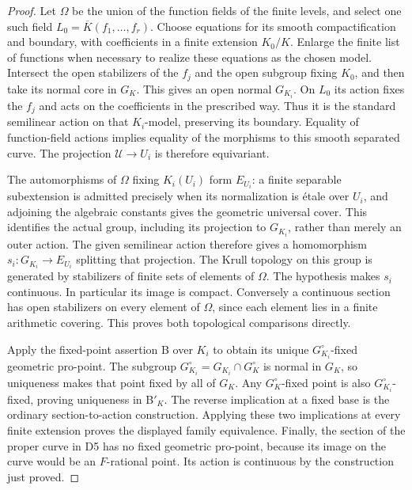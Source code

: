 \begin{proof}
Let $\Omega$ be the union of the function fields of the finite levels,
and select one such field $L_0=\overline K(f_1,\ldots,f_r)$.
Choose equations for its smooth compactification and boundary, with
coefficients in a finite extension $K_0/K$.  Enlarge the finite list of
functions when necessary to realize these equations as the chosen
model.  Intersect the open stabilizers of the $f_j$ and the open
subgroup fixing $K_0$, and then take its normal core in $G_K$.
This gives an open normal $G_{K_i}$.  On $L_0$ its action fixes the
$f_j$ and acts on the coefficients in the prescribed way.  Thus it
is the standard semilinear action on that $K_i$-model, preserving its
boundary.  Equality of function-field actions implies equality of the
morphisms to this smooth separated curve.  The projection
$\mathcal U\to U_i$ is therefore equivariant.

The automorphisms of $\Omega$ fixing $K_i(U_i)$ form $E_{U_i}$: a
finite separable subextension is admitted precisely when its
normalization is \'etale over $U_i$, and adjoining the algebraic
constants gives the geometric universal cover.  This identifies the
actual group, including its projection to $G_{K_i}$, rather than merely
an outer action.  The given semilinear action therefore gives a
homomorphism $s_i:G_{K_i}\to E_{U_i}$ splitting that projection.
The Krull topology on this group is generated by stabilizers of finite
sets of elements of $\Omega$.  The hypothesis makes $s_i$ continuous.
In particular its image is compact.  Conversely a continuous section
has open stabilizers on every element of $\Omega$, since each element
lies in a finite arithmetic covering.  This proves both topological
comparisons directly.

Apply the fixed-point assertion B over $K_i$ to obtain its unique
$G_{K_i}^\circ$-fixed geometric pro-point.  The subgroup
$G_{K_i}^\circ=G_{K_i}\cap G_K^\circ$ is normal in $G_K$, so uniqueness
makes that point fixed by all of $G_K$.  Any $G_K^\circ$-fixed point
is also $G_{K_i}^\circ$-fixed, proving uniqueness in B$'_K$.
The reverse implication at a fixed base is the ordinary
section-to-action construction.  Applying these two implications at
every finite extension proves the displayed family equivalence.
Finally, the section of the proper curve in D5 has no fixed geometric
pro-point, because its image on the curve would be an $F$-rational
point.  Its action is continuous by the construction just proved.
\end{proof}

